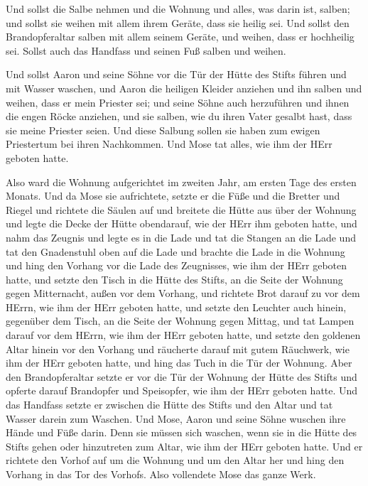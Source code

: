  Und sollst die Salbe nehmen und die Wohnung und alles, was
darin ist, salben; und sollst sie weihen mit allem ihrem Geräte, dass
sie heilig sei.  Und sollst den Brandopferaltar salben mit
allem seinem Geräte, und weihen, dass er hochheilig sei. 
Sollst auch das Handfass und seinen Fuß salben und weihen.

 Und sollst Aaron und seine Söhne vor die Tür der Hütte des
Stifts führen und mit Wasser waschen,  und Aaron die
heiligen Kleider anziehen und ihn salben und weihen, dass er mein
Priester sei;  und seine Söhne auch herzuführen und ihnen
die engen Röcke anziehen,  und sie salben, wie du ihren
Vater gesalbt hast, dass sie meine Priester seien. Und diese Salbung
sollen sie haben zum ewigen Priestertum bei ihren Nachkommen.
 Und Mose tat alles, wie ihm der HErr geboten hatte.

 Also ward die Wohnung aufgerichtet im zweiten Jahr, am
ersten Tage des ersten Monats.  Und da Mose sie
aufrichtete, setzte er die Füße und die Bretter und Riegel und richtete
die Säulen auf  und breitete die Hütte aus über der Wohnung
und legte die Decke der Hütte obendarauf, wie der HErr ihm geboten
hatte,  und nahm das Zeugnis und legte es in die Lade und
tat die Stangen an die Lade und tat den Gnadenstuhl oben auf die Lade
 und brachte die Lade in die Wohnung und hing den Vorhang
vor die Lade des Zeugnisses, wie ihm der HErr geboten hatte,
 und setzte den Tisch in die Hütte des Stifts, an die Seite
der Wohnung gegen Mitternacht, außen vor dem Vorhang,  und
richtete Brot darauf zu vor dem HErrn, wie ihm der HErr geboten hatte,
 und setzte den Leuchter auch hinein, gegenüber dem Tisch,
an die Seite der Wohnung gegen Mittag,  und tat Lampen
darauf vor dem HErrn, wie ihm der HErr geboten hatte,  und
setzte den goldenen Altar hinein vor den Vorhang  und
räucherte darauf mit gutem Räuchwerk, wie ihm der HErr geboten hatte,
 und hing das Tuch in die Tür der Wohnung. 
Aber den Brandopferaltar setzte er vor die Tür der Wohnung der Hütte des
Stifts und opferte darauf Brandopfer und Speisopfer, wie ihm der HErr
geboten hatte.  Und das Handfass setzte er zwischen die
Hütte des Stifts und den Altar und tat Wasser darein zum Waschen.
 Und Mose, Aaron und seine Söhne wuschen ihre Hände und
Füße darin.  Denn sie müssen sich waschen, wenn sie in die
Hütte des Stifts gehen oder hinzutreten zum Altar, wie ihm der HErr
geboten hatte.  Und er richtete den Vorhof auf um die
Wohnung und um den Altar her und hing den Vorhang in das Tor des
Vorhofs. Also vollendete Mose das ganze Werk.

